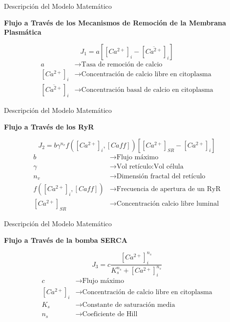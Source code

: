 \begin{frame}{Descripción del Modelo Matemático}
	\Large \begin{center}
		\textbf{Flujo a Través de los Mecanismos de Remoción de la Membrana Plasmática}
	\end{center}
	
	\begin{equation*}
	J_1 = a\left[[Ca^{2+}]_i - [\overline{Ca^{2+}}]_i\right]
	\end{equation*}	
	\begin{align*}
	a & \rightarrow \text{Tasa de remoción de calcio}  \\
	[Ca^{2+}]_i & \rightarrow \text{Concentración de calcio libre en citoplasma} \\
	[\overline{Ca^{2+}}]_i & \rightarrow \text{Concentración basal de calcio en citoplasma}
	\end{align*}

\end{frame}

\begin{frame}{Descripción del Modelo Matemático}
	\Large \begin{center}
			\textbf{Flujo a Través de los RyR}
	\end{center}	
	\begin{equation*}
		J_2 = b\gamma^{n_v}f\left([Ca^{2+}]_i,[Caff]\right)\left[[Ca^{2+}]_{SR}-[Ca^{2+}]_i\right]
	\end{equation*}
	\begin{align*}
	b & \rightarrow \text{Flujo máximo} \\
	\gamma & \rightarrow \text{Vol retículo:Vol célula} \\
	n_v & \rightarrow \text{Dimensión fractal del retículo} \\
	f\left([Ca^{2+}]_i,[Caff]\right) & \rightarrow \text{Frecuencia de apertura de un RyR} \\
	[Ca^{2+}]_{SR} & \rightarrow \text{Concentración calcio libre luminal}
	\end{align*}
	
\end{frame}

\begin{frame}{Descripción del Modelo Matemático}
	\Large \begin{center}
		\textbf{Flujo a Través de la bomba SERCA}
	\end{center}
	
	\begin{equation*}
		J_3 = c\frac{[Ca^{2+}]^{n_s}_i}{K^{n_s}_s+[Ca^{2+}]^{n_s}_i}
	\end{equation*}
	\begin{align*}
	c & \rightarrow \text{Flujo máximo}  \\
	[Ca^{2+}]_i & \rightarrow \text{Concentración de calcio libre en citoplasma} \\
	K_s & \rightarrow \text{Constante de saturación media} \\
	n_s & \rightarrow \text{Coeficiente de Hill}
	\end{align*}
\end{frame}

